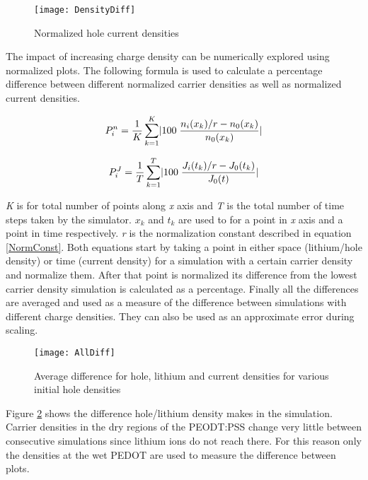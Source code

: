 \begin{doublespace}
\begin{figure}[!htp]
\centering
\texttt{[image: DensityDiff]}
\caption{Normalized hole current densities} 
\label{DensityDiff}
\end{figure}

The impact of increasing charge density can be numerically explored using normalized plots. The following formula is used to calculate a percentage difference between different normalized carrier densities as well as normalized current densities. 

\begin{equation}
\centering
P_i^{n} = \frac{1}{ K}\sum_{k=1}^{K}\lvert 100 \;\frac{n_{i}(x_k)/r-n_{0}(x_k)}{n_{0}(x_k)}\rvert
\end{equation}

\begin{equation}
\centering
P_i^{J} = \frac{1}{ T}\sum_{k=1}^{T}\lvert 100 \;\frac{J_{i}(t_k)/r-J_{0}(t_k)}{J_{0}(t)}\rvert
\end{equation}

\textit{K} is for total number of points along \textit{x} axis and \textit{T} is the total number of time steps taken by the simulator. $x_{k}$ and $t_{k}$ are used to for a point in \textit{x} axis and a point in time respectively. \textit{r} is the normalization constant described in equation \ref{NormConst}. Both equations start by taking a point in either space (lithium/hole density) or time (current density) for a simulation with a certain carrier density and normalize them. After that point is normalized its difference from the lowest carrier density simulation is calculated as a percentage. Finally all the differences are averaged and used as a measure of the difference between simulations with different charge densities. They can also be used as an approximate error during scaling. 

\begin{figure}[!htp]
\centering
\texttt{[image: AllDiff]}
\caption{Average difference for hole, lithium and current densities for various initial hole densities} 
\label{AllDiff}
\end{figure}

Figure \ref{AllDiff} shows the difference hole/lithium density makes in the simulation. Carrier densities in the dry regions of the PEODT:PSS change very little between consecutive simulations since lithium ions do not reach there. For this reason only the densities at the wet PEDOT are used to measure the difference between plots. 


\end{doublespace}
